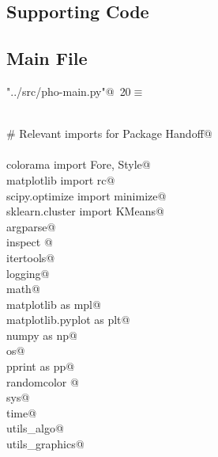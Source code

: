 \documentclass[10.0pt]{report}
\begin{document}
\begin{appendices}
\chapter{Supporting Code}

\section{Main File}



\begin{flushleft} \small\label{scrap9}\raggedright\small
{} \verb@"../src/pho-main.py"@\nobreak\ {\footnotesize {20}}$\equiv$
\vspace{-1ex}
\begin{list}{}{} \item
\mbox{}\verb@@\\
\mbox{}\verb@# Relevant imports for Package Handoff@\\
\mbox{}\verb@@\\
\mbox{}\verb@from colorama import Fore, Style@\\
\mbox{}\verb@from matplotlib import rc@\\
\mbox{}\verb@from scipy.optimize import minimize@\\
\mbox{}\verb@from sklearn.cluster import KMeans@\\
\mbox{}\verb@import argparse@\\
\mbox{}\verb@import inspect @\\
\mbox{}\verb@import itertools@\\
\mbox{}\verb@import logging@\\
\mbox{}\verb@import math@\\
\mbox{}\verb@import matplotlib as mpl@\\
\mbox{}\verb@import matplotlib.pyplot as plt@\\
\mbox{}\verb@import numpy as np@\\
\mbox{}\verb@import os@\\
\mbox{}\verb@import pprint as pp@\\
\mbox{}\verb@import randomcolor @\\
\mbox{}\verb@import sys@\\
\mbox{}\verb@import time@\\
\mbox{}\verb@import utils_algo@\\
\mbox{}\verb@import utils_graphics@\\
\mbox{}\verb@@\\

\end{list}
\end{flushleft}
\end{appendices}
\end{document}
